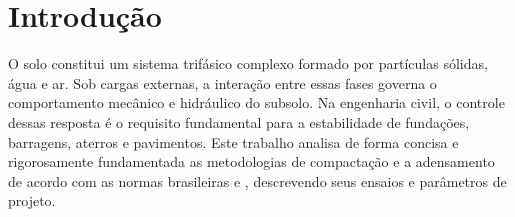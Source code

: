 \chapter{Introdução}

O solo constitui um sistema trifásico complexo formado por partículas sólidas, água e ar. Sob cargas externas, a interação entre essas fases governa o comportamento mecânico e hidráulico do subsolo. Na engenharia civil, o controle dessas resposta é o requisito fundamental para a estabilidade de fundações, barragens, aterros e pavimentos. Este trabalho analisa de forma concisa e rigorosamente fundamentada as metodologias de compactação e a adensamento de acordo com as normas brasileiras  e , descrevendo seus ensaios e parâmetros de projeto.